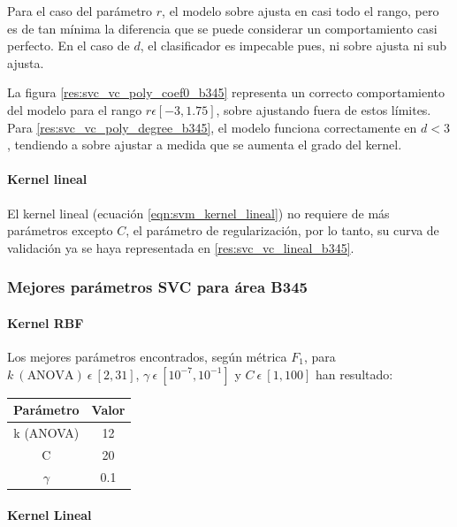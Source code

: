 Para el caso del parámetro $r$, el modelo sobre ajusta en casi todo el rango, pero es de tan mínima la diferencia que se puede considerar un comportamiento casi perfecto. En el caso de $d$, el clasificador es impecable pues, ni sobre ajusta ni sub ajusta.

La figura \ref{res:svc_vc_poly_coef0_b345} representa un correcto comportamiento del modelo para el rango $r\epsilon[-3,1.75]$, sobre ajustando fuera de estos límites. Para \ref{res:svc_vc_poly_degree_b345}, el modelo funciona correctamente en $d<3$, tendiendo a sobre ajustar a medida que se aumenta el grado del kernel.

\paragraph{Kernel lineal}

El kernel lineal (ecuación \ref{eqn:svm_kernel_lineal}) no requiere de más parámetros excepto $C$, el parámetro de regularización, por lo tanto, su curva de validación ya se haya representada en \ref{res:svc_vc_lineal_b345}.

\subsubsection{Mejores parámetros SVC para área B345}

\paragraph{Kernel RBF}

Los mejores parámetros encontrados, según métrica $F_{1}$, para $k\:(\mbox{ANOVA})\:\epsilon\:[2,31]$, $\gamma\:\epsilon\:[10^{-7},10^{-1}]$ y $C\:\epsilon\:[1,100]$ han resultado:

\begin{table}[H]
	\begin{tabular}{|c|c|}
		\hline
		Parámetro & Valor \\ \hline
		k (ANOVA) & 12 \\ \hline
		C & 20\\ \hline
		$\gamma$ & 0.1\\ \hline
	\end{tabular}
\end{table}

\paragraph{Kernel Lineal}

